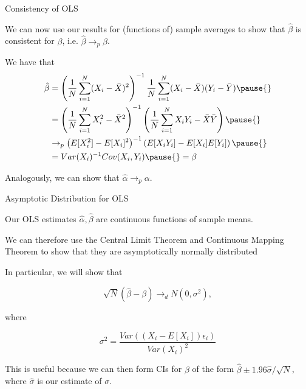 \documentclass[11pt,english,handout]{beamer}
\newenvironment{wideitemize}{\itemize\addtolength{\itemsep}{10pt}}{\enditemize}
\begin{document}
\begin{frame}{Consistency of OLS}
\begin{wideitemize}
\item
We can now use our results for (functions of) sample averages to show that $\hat\beta$ is consistent for $\beta$, i.e. $\hat\beta \rightarrow_p \beta$.

\pause
\item
We have that
\begin{align*}
 \hat\beta &=\left( \frac{1}{N} \sum_{i=1}^N (X_i - \bar{X})^2 \right)^{-1}   \frac{1}{N} \sum_{i=1}^{N} (X_i - \bar{X})(Y_i - \bar{Y}) \pause{}  \\
 &= \left( \frac{1}{N} \sum_{i=1}^N X_i^2 - \bar{X}^2 \right)^{-1}   \left( \frac{1}{N} \sum_{i=1}^{N} X_i Y_i - \bar{X} \bar{Y} \right) \pause{} \\
 & \rightarrow_p \left( E[X_i^2] - E[X_i]^2 \right)^{-1}   \left( E[X_i Y_i] - E[X_i] E[Y_i] \right) \pause{} \\
 &= Var(X_i)^{-1} Cov(X_i, Y_i) \pause{} = \beta
\end{align*}


\pause
\item
Analogously, we can show that $\hat\alpha \rightarrow_p \alpha$.
\end{wideitemize}		
\end{frame}


\begin{frame}{Asymptotic Distribution for OLS}
	\begin{wideitemize}
	\item
	Our OLS estimates $\hat\alpha, \hat\beta$ are continuous functions of sample means.
	
	\pause
	\item
	We can therefore use the Central Limit Theorem and Continuous Mapping Theorem to show that they are asymptotically normally distributed
	
	\pause
	\item
	In particular, we will show that
	
		$$\sqrt{N}(\hat\beta - \beta) \rightarrow_d N(0, \sigma^2),$$
	
	\noindent where
	
	$$\sigma^2 = \dfrac{  Var((X_i - E[X_i])\epsilon_i) }{ Var(X_i)^2  }$$ 
	
	
	\pause
	\item
	This is useful because we can then form CIs for $\beta$ of the form $\hat\beta 	\pm 1.96 \hat\sigma / \sqrt{N}$, where $\hat\sigma$ is our estimate of $\sigma$. 
	
	\end{wideitemize}	
\end{frame}
\end{document}
